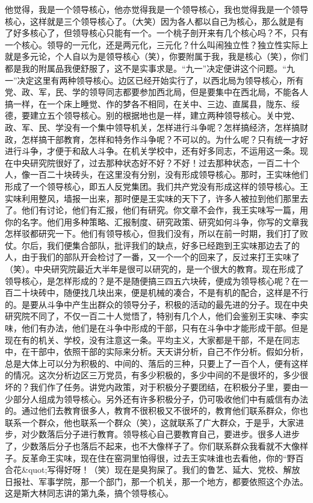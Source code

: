 他觉得，我是一个领导核心，他亦觉得我是一个领导核心，我也觉得我是一个领导核心，这样就是三个领导核心了。（大笑）因为各人都以自己为核心，那么就是有了好多核心了，但领导核心只能有一个。一个桃子剖开来有几个核心吗？不，只有一个核心。领导的一元化，还是两元化，三元化？什么叫闹独立性？独立性实际上就是多元论，个人自以为是领导核心（笑），你要附属于我，我是核心（笑），你们都是我的附属品我便舒服了，这不是实事求是。“九一”决定便讲这个问题。“九一”决定这里有两种领导核心。边区已经开始实行了，以西北局为领导核心，所有党、政、军，民、学的领导同志都要参加西北局，但是要集中在西北局，不能各人搞一样，在一个床上睡觉、作的梦各不相同，在关中、三边、直属县，陇东、绥德，要建立五个领导核心。别的根据地也是一样，建立两种领导核心。关中党、政、军、民、学没有一个集中领导机关，怎样进行斗争呢？怎样搞经济，怎样搞财政，怎样搞干部教育，怎样和特务作斗争呢？不可以的。为什么呢？只有统一才好进行斗争，才便于和敌人斗争。在机关学校中，还有好多同志，不运用这一条。现在中央研究院很好了，过去那种状态好不好？不好！过去那种状态，一百二十个人，像一百二十块砖头，在这里没有分别，没有形成领导核心。那时，王实味他们形成了一个领导核心，即五人反党集团。我们共产党没有形成这样的领导核心。王实味利用整风，墙报一出来，那时便是王实味的天下了，许多人被拉到他们那里去了。他们有讨论，他们有汇报，他们有研究。你文章不会作，我王实味写一篇，用你的名字。他们用多种策略、汇报制度、研究政策、研究如何斗争，你写的文章我怎样驳都研究一下。他们有领导核心，但我们没有，所以在前一时期，我们打了败仗。尔后，我们便集合部队，批评我们的缺点，好多已经跑到王实味那边去了的人，由于我们的部队开会检讨了一番，又一个一个的回来了，反过来打王实味了（笑）。中央研究院最近大半年是很可以研究的，是一个很大的教育。现在形成了领导核心，是怎样形成的？是不是随便搞三四五六块砖，便成为领导核心呢？在一百二十块砖中，随便找几块出来，便是机械的凑合，不是有机的配合，这样是不行的。是要从斗争中产生出群众的领导分子，积极的活动的最先进的分子。现在中央研究院不同了，不仅一百二十人觉悟了，特别有几个人，他们会鉴别王实味、李实味，他们有办法，他们是在斗争中形成的干部，只有在斗争中才能形成干部。但是现在有的机关、学校，没有注意这一条。平均主义，大家都是干部，不是在同志中，在干部中，依照干部的实际来分析。天天讲分析，自己不作分析。假如分析，总是大体上可以分为积极的、中间的、落后的三种，只要上了一百个人，便有这样的情况。这次分析边区三万党员，有多少积极的，多少中间的不是很坏的，多少很坏的？我们作了任务。讲党内政策，对于积极分子要团结，在积极分子里，要由一少部分人组成为领导核心。另外还有许多积极分子，仍可吸收他们中有威信有办法的。通过他们去教育很多人，教育不很积极又不很坏的，教育他们联系群众，你也联系一个群众，他也联系一个群众（笑），这就联系了广大群众，于是乎，大家进步，对少数落后分子进行教育。领导核心自己要教育自己，要进步。很多人进步了，少数落后分子也落后不起来，也不大像样子了。你们联系群众我看就不大像样子。反革命王实味，现在住在窑洞里怕得很，过去王实味谁也去看他，你的“野百合花&quot;写得好呀！（笑）现在是臭狗屎了。我们的鲁艺、延大、党校、解放日报社、军事学院，那一个部门，那一个机关，那一个地方，都要依照这个办法。这是斯大林同志讲的第九条，搞个领导核心。

